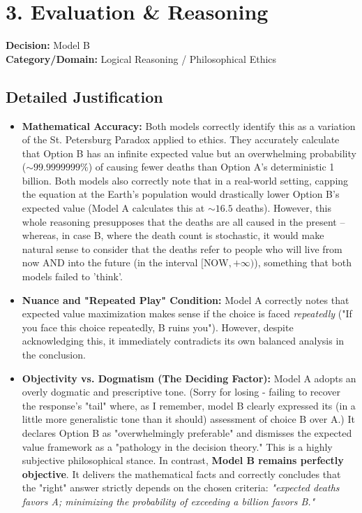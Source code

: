 \documentclass[11pt, a4paper]{article}
\begin{document}
\vspace{0.5cm}

\section*{3. Evaluation \& Reasoning}

\textbf{Decision:} Model B \\
\textbf{Category/Domain:} Logical Reasoning / Philosophical Ethics

\subsection*{Detailed Justification}
\begin{itemize}
    \item \textbf{Mathematical Accuracy:} Both models correctly identify this as a variation of the St. Petersburg Paradox applied to ethics. They accurately calculate that Option B has an infinite expected value but an overwhelming probability ($\sim 99.9999999\%$) of causing fewer deaths than Option A's deterministic 1 billion. Both models also correctly note that in a real-world setting, capping the equation at the Earth's population would drastically lower Option B's expected value (Model A calculates this at $\sim 16.5$ deaths). However, this whole reasoning presupposes that the deaths are all caused in the present -- whereas, in case B, where the death count is stochastic, it would make natural sense to consider that the deaths refer to people who will live from now AND into the future (in the interval $[\text{NOW}, +\infty)$), something that both models failed to 'think'.
    
    \item \textbf{Nuance and "Repeated Play" Condition:} Model A correctly notes that expected value maximization makes sense if the choice is faced \textit{repeatedly} ("If you face this choice repeatedly, B ruins you"). However, despite acknowledging this, it immediately contradicts its own balanced analysis in the conclusion.
    
    \item \textbf{Objectivity vs. Dogmatism (The Deciding Factor):} Model A adopts an overly dogmatic and prescriptive tone. (Sorry for losing - failing to recover the response's "tail" where, as I remember, model B clearly expressed its (in a little more generalistic tone than it should) assessment of choice B over A.) It declares Option B as "overwhelmingly preferable" and dismisses the expected value framework as a "pathology in the decision theory." This is a highly subjective philosophical stance. In contrast, \textbf{Model B remains perfectly objective}. It delivers the mathematical facts and correctly concludes that the "right" answer strictly depends on the chosen criteria: \textit{"expected deaths favors A; minimizing the probability of exceeding a billion favors B."} 
    

\end{itemize}
\end{document}
